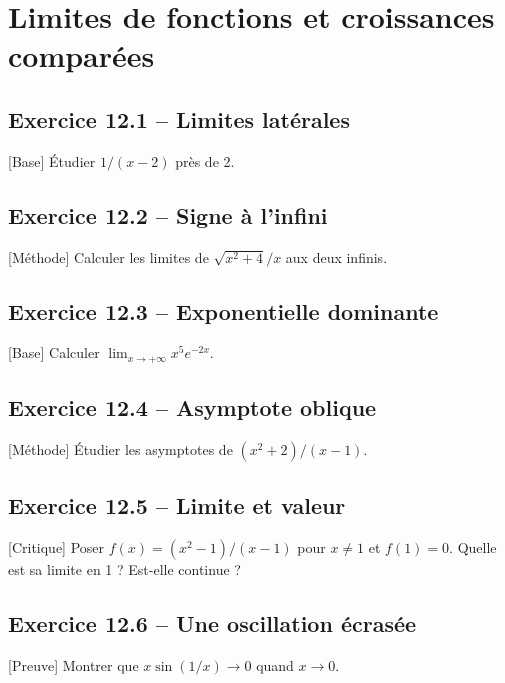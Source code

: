 \chapter{Limites de fonctions et croissances comparées}
\section*{Exercice 12.1 -- Limites latérales}
[Base] Étudier $1/(x-2)$ près de 2.

\section*{Exercice 12.2 -- Signe à l’infini}
[Méthode] Calculer les limites de $\sqrt{x^2+4}/x$ aux deux infinis.

\section*{Exercice 12.3 -- Exponentielle dominante}
[Base] Calculer $\lim_{x\to+\infty}x^5e^{-2x}$.

\section*{Exercice 12.4 -- Asymptote oblique}
[Méthode] Étudier les asymptotes de $(x^2+2)/(x-1)$.

\section*{Exercice 12.5 -- Limite et valeur}
[Critique] Poser $f(x)=(x^2-1)/(x-1)$ pour $x\ne1$ et $f(1)=0$. Quelle est sa limite en 1 ? Est-elle continue ?

\section*{Exercice 12.6 -- Une oscillation écrasée}
[Preuve] Montrer que $x\sin(1/x)\to0$ quand $x\to0$.

